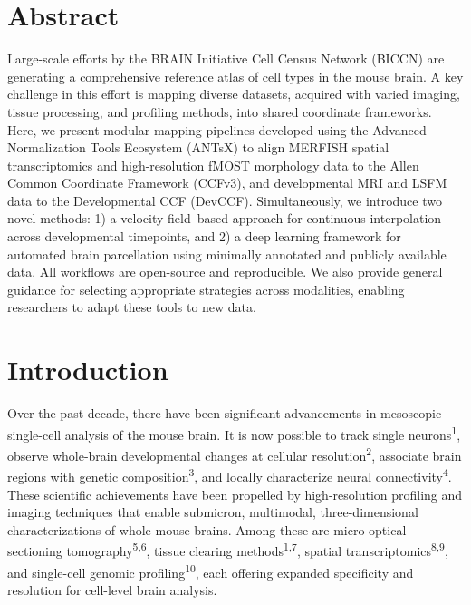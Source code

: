 \documentclass[
  12pt,
]{article}
\begin{document}
\normalsize

\newpage


\section*{Abstract}\label{abstract}

Large-scale efforts by the BRAIN Initiative Cell Census Network (BICCN)
are generating a comprehensive reference atlas of cell types in the
mouse brain. A key challenge in this effort is mapping diverse datasets,
acquired with varied imaging, tissue processing, and profiling methods,
into shared coordinate frameworks. Here, we present modular mapping
pipelines developed using the Advanced Normalization Tools Ecosystem
(ANTsX) to align MERFISH spatial transcriptomics and high-resolution
fMOST morphology data to the Allen Common Coordinate Framework (CCFv3),
and developmental MRI and LSFM data to the Developmental CCF (DevCCF).
Simultaneously, we introduce two novel methods: 1) a velocity
field--based approach for continuous interpolation across developmental
timepoints, and 2) a deep learning framework for automated brain
parcellation using minimally annotated and publicly available data. All
workflows are open-source and reproducible. We also provide general
guidance for selecting appropriate strategies across modalities,
enabling researchers to adapt these tools to new data.

\clearpage

\section{Introduction}\label{introduction}

Over the past decade, there have been significant advancements in
mesoscopic single-cell analysis of the mouse brain. It is now possible
to track single neurons\textsuperscript{1}, observe whole-brain
developmental changes at cellular resolution\textsuperscript{2},
associate brain regions with genetic composition\textsuperscript{3}, and
locally characterize neural connectivity\textsuperscript{4}. These
scientific achievements have been propelled by high-resolution profiling
and imaging techniques that enable submicron, multimodal,
three-dimensional characterizations of whole mouse brains. Among these
are micro-optical sectioning tomography\textsuperscript{5,6}, tissue
clearing methods\textsuperscript{1,7}, spatial
transcriptomics\textsuperscript{8,9}, and single-cell genomic
profiling\textsuperscript{10}, each offering expanded specificity and
resolution for cell-level brain analysis.
\end{document}
